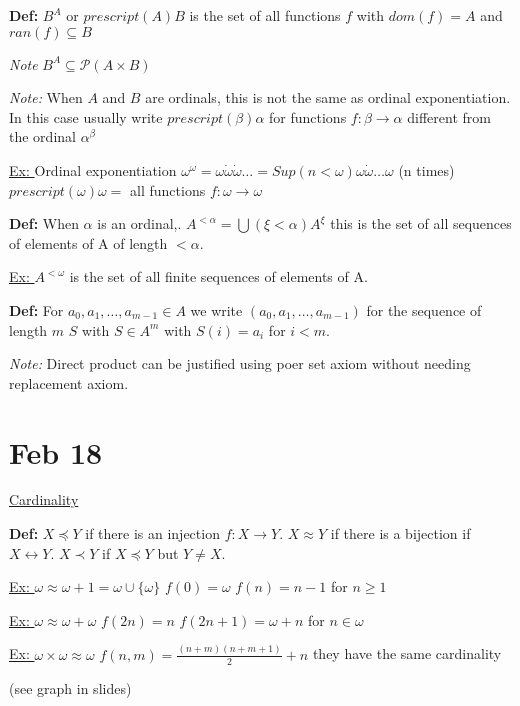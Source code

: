 \documentclass{article}
\newcommand{\defn}{\textbf{Def: }}
\newcommand{\set}[1]{\{#1\}}
\begin{document}
    \textbf{Def:} $B^A$ or $prescript(A)B$ is the set of all functions $f$ with $dom(f) = A$ and $ran(f) \subseteq B$

    \emph{Note} $B^A \subseteq \mathcal{P}(A \times B)$

    \emph{Note: } When $A$ and $B$ are ordinals, this is not the same as ordinal exponentiation.
    In this case usually write $prescript(\beta)\alpha$ for functions $f : \beta \rightarrow \alpha$ different from the ordinal $\alpha^{\beta}$

    \underline{Ex: } Ordinal exponentiation $\omega^{\omega} = \omega \dot \omega \dot \omega \dots = Sup(n < \omega) \omega \dot \omega \dots \omega$ (n times)
    $prescript(\omega)\omega = $ all functions $f : \omega \rightarrow \omega$

    \textbf{Def:} When $\alpha$ is an ordinal,. $A^{<\alpha} = \bigcup(\xi < \alpha) A^{\xi}$
    this is the set of all sequences of elements of A of length $<\alpha$.

    \underline{Ex: } $A^{<\omega}$ is the set of all finite sequences of elements of A.

    \textbf{Def: } For $a_0,a_1,\dots,a_{m-1} \in A$ we write $(a_0,a_1,\dots,a_{m-1})$ for the sequence of length $m$ $S$ with $S \in A^m$ with $S(i) = a_i$ for $i<m$.

    \emph{Note: } Direct product can be justified using poer set axiom without needing replacement axiom.


    \section{Feb 18}

    \underline{Cardinality}

    \defn $X \preceq Y$ if there is an injection $f: X \rightarrow Y$.
    $X \approx Y$ if there is a bijection if $X \leftrightarrow Y$.
    $X \prec Y$ if $X \preceq Y$ but $Y \neq X$.

    \underline{Ex: } $\omega \approx \omega + 1 = \omega \cup \set{\omega}$
    $f(0) = \omega$
    $f(n) = n-1$ for $n \geq 1$

    \underline{Ex: } $\omega \approx \omega + \omega$
    $f(2n) = n$
    $f(2n +1) = \omega + n$ for $n \in \omega$

    \underline{Ex: } $\omega \times \omega \approx \omega$
    $f(n,m) = \frac{(n+m)(n+m+1)}{2} + n$
    they have the same cardinality

    (see graph in slides)
\end{document}
